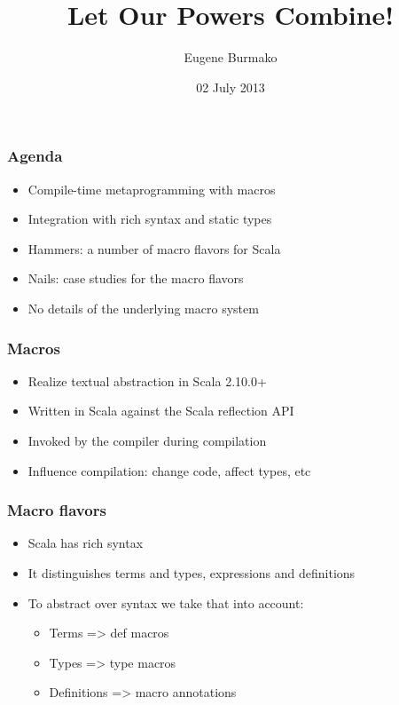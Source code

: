 \documentclass[svgnames,hyperref={bookmarks=false}]{beamer}
\title{Let Our Powers Combine!}
\begin{document}
\author{Eugene Burmako}
\date{02 July 2013}
{
\begin{frame}
  \titlepage
\end{frame}
}

\begin{frame}[fragile]
\frametitle{Agenda}

\begin{itemize}
\item Compile-time metaprogramming with macros
\item Integration with rich syntax and static types
\item Hammers: a number of macro flavors for Scala
\item Nails: case studies for the macro flavors
\item No details of the underlying macro system
\end{itemize}
\end{frame}

\begin{frame}[fragile]
\frametitle{}

\vskip40pt
\begin{center}
\end{center}
\end{frame}

\begin{frame}[fragile]
\frametitle{Macros}

\begin{itemize}
\item Realize textual abstraction in Scala 2.10.0+
\item Written in Scala against the Scala reflection API
\item Invoked by the compiler during compilation
\item Influence compilation: change code, affect types, etc
\end{itemize}
\end{frame}

\begin{frame}[fragile]
\frametitle{Macro flavors}

\begin{itemize}
\item Scala has rich syntax
\item It distinguishes terms and types, expressions and definitions
\item To abstract over syntax we take that into account:
\begin{itemize}
\item Terms => def macros
\item Types => type macros
\item Definitions => macro annotations
\end{itemize}
\end{itemize}
\end{frame}
\end{document}

